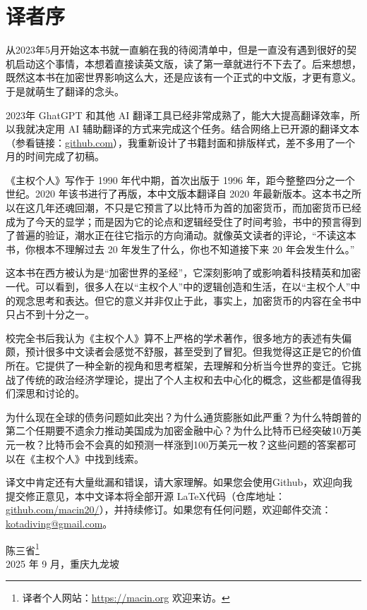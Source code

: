 \chapter{译者序}

从2023年5月开始这本书就一直躺在我的待阅清单中，但是一直没有遇到很好的契机启动这个事情，本想着直接读英文版，读了第一章就进行不下去了。后来想想，既然这本书在加密世界影响这么大，还是应该有一个正式的中文版，才更有意义。于是就萌生了翻译的念头。

2023年 GhatGPT 和其他 AI 翻译工具已经非常成熟了，能大大提高翻译效率，所以我就决定用 AI 辅助翻译的方式来完成这个任务。结合网络上已开源的翻译文本（参看链接：\href{https://github.com/lj92458/the_sovereign_individual}{github.com}），我重新设计了书籍封面和排版样式，差不多用了一个月的时间完成了初稿。


《主权个人》写作于 1990 年代中期，首次出版于 1996 年，距今整整四分之一个世纪。2020 年该书进行了再版，本中文版本翻译自 2020 年最新版本。这本书之所以在这几年还魂回潮，不只是它预言了以比特币为首的加密货币，而加密货币已经成为了今天的显学；而是因为它的论点和逻辑经受住了时间考验，书中的预言得到了普遍的验证，潮水正在往它指示的方向涌动。就像英文读者的评论，“不读这本书，你根本不理解过去 20 年发生了什么，你也不知道接下来 20 年会发生什么。”

这本书在西方被认为是“加密世界的圣经”，它深刻影响了或影响着科技精英和加密一代。可以看到，很多人在以“主权个人”中的逻辑创造和生活，在以“主权个人”中的观念思考和表达。但它的意义并非仅止于此，事实上，加密货币的内容在全书中只占不到十分之一。

校完全书后我认为《主权个人》算不上严格的学术著作，很多地方的表述有失偏颇，预计很多中文读者会感觉不舒服，甚至受到了冒犯。但我觉得这正是它的价值所在。它提供了一种全新的视角和思考框架，去理解和分析当今世界的变迁。它挑战了传统的政治经济学理论，提出了个人主权和去中心化的概念，这些都是值得我们深思和讨论的。

为什么现在全球的债务问题如此突出？为什么通货膨胀如此严重？为什么特朗普的第二个任期要不遗余力推动美国成为加密金融中心？为什么比特币已经突破10万美元一枚？比特币会不会真的如预测一样涨到100万美元一枚？这些问题的答案都可以在《主权个人》中找到线索。

译文中肯定还有大量纰漏和错误，请大家理解。如果您会使用Github，欢迎向我提交修正意见，本中文译本将全部开源 \LaTeX 代码（仓库地址：\href{https://github.com/Macin20/sovereign-individual-cn}{github.com/macin20/}），并持续修订。如果您有任何问题，欢迎邮件交流：\href{mailto:kotadiving@gmail.com}{kotadiving@gmail.com}。


\begin{flushright}
\kaishu 陈三省\footnote{译者个人网站：\href{https://macin.org}{https://macin.org} 欢迎来访。} \\
2025 年 9 月，重庆九龙坡
\end{flushright} 